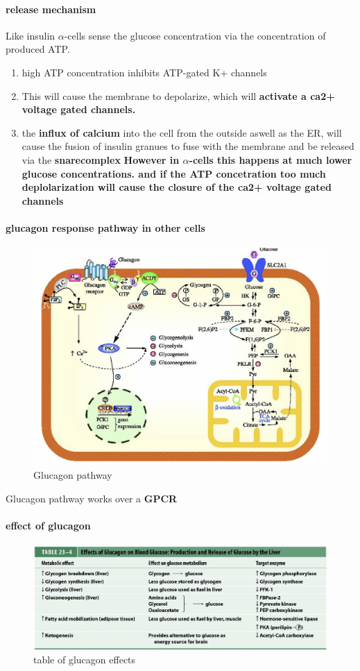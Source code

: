 \documentclass[../main.tex]{subfiles}
\begin{document}
\paragraph{release mechanism}
Like insulin $\alpha$-cells sense the glucose concentration via the concentration of produced ATP.
\begin{enumerate}
    \item high ATP concentration inhibits ATP-gated K+ channels
    \item This will cause the membrane to depolarize, which will\textbf{ activate a ca2+ voltage gated channels. }
    \item the \textbf{influx of calcium} into the cell from the outside aswell as the ER, will cause the fusion of insulin granues to fuse with the membrane and be released via the \textbf{\gls{snarecomplex}} \textbf{However in $\alpha$-cells this happens at much lower glucose concentrations. and if the ATP concetration too much deplolarization will cause the closure of the ca2+ voltage gated channels}
\end{enumerate}
\paragraph{glucagon response pathway in other cells}
\begin{figure}[H]
    \centering
    \includegraphics[width=0.5\linewidth]{GlucagonPathway.png}
    \caption{Glucagon pathway}
    \label{fig:enter-label}
\end{figure}
Glucagon pathway works over a \textbf{GPCR}

\paragraph{effect of glucagon}
\begin{figure}[H]
    \centering
    \includegraphics[width=1\linewidth]{Sum_BC_II//lectures//bcll12/glucagonTable.png}
    \caption{table of glucagon effects}
    \label{fig:enter-label}
\end{figure}
\end{document}
